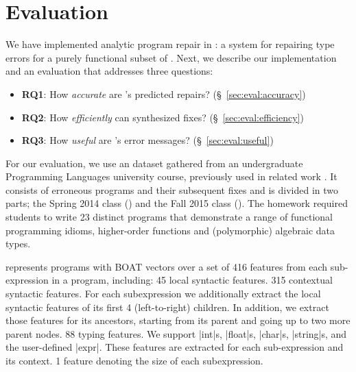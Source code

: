 \section{Evaluation}
\label{sec:eval}

\lstMakeShortInline[mathescape=true]{|}

We have implemented analytic program repair in \toolname: a system for 
repairing type errors for a purely functional subset of \ocaml. Next,
we describe our implementation and an evaluation that addresses three 
questions:

\begin{itemize}
    \item \textbf{RQ1}: How \emph{accurate} are \toolname's predicted repairs? 
                        (\S~\ref{sec:eval:accuracy}) 
    \item \textbf{RQ2}: How \emph{efficiently} can \toolname synthesized fixes?
                        (\S~\ref{sec:eval:efficiency}) 
    \item \textbf{RQ3}: How \emph{useful} are \toolname's error messages? 
                        (\S~\ref{sec:eval:useful}) 
\end{itemize}


%
For our evaluation, we use an \ocaml dataset gathered from an undergraduate
Programming Languages university course, previously used in related work
\citep{yunounderstand,Seidel:2017}. It consists of erroneous programs and their
subsequent fixes and is divided in two parts; the Spring 2014 class (\SPRING)
and the Fall 2015 class (\FALL). The homework required students to write 23
distinct programs that demonstrate a range of functional programming idioms, \eg
higher-order functions and (polymorphic) algebraic data types.

%
\toolname represents programs with BOAT vectors over 
a set of 416 features from each sub-expression in a 
program, including: 
%
45 local syntactic features.
%
315 contextual syntactic features. For each subexpression we
additionally extract the local syntactic features of its first 4
(left-to-right) children. In addition, we extract those features for its
ancestors, starting from its parent and going up to two more parent nodes.
88 typing features. We support |int|s, |float|s, |char|s, |string|s, and
    the user-defined |expr|. These features are extracted for each
    sub-expression and its context.
% 
1 feature denoting the size of each subexpression.

